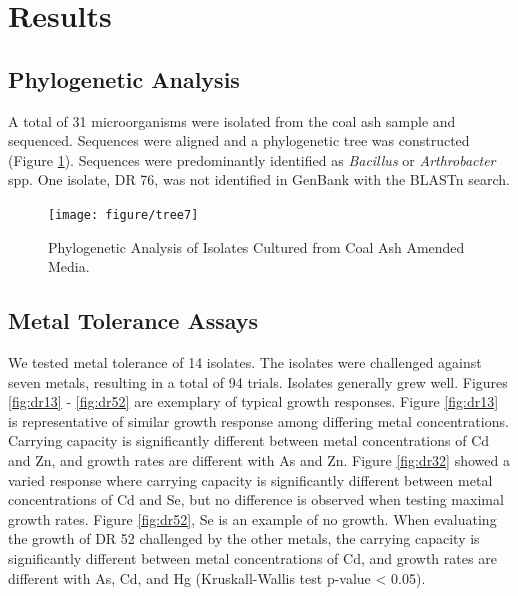 \documentclass[ms, hidelinks]{uncgdissertationexp}
\theoremstyle{plain}
\theoremstyle{definition}
\theoremstyle{remark}
\begin{document}
\hypertarget{results-1}{%
\section{Results}\label{results-1}}

\hypertarget{phylogenetic-analysis}{%
\subsection{Phylogenetic Analysis}\label{phylogenetic-analysis}}

A total of 31 microorganisms were isolated from the coal ash sample and sequenced. Sequences were aligned and a phylogenetic tree was constructed (Figure \ref{fig:tree}). Sequences were predominantly identified as \emph{Bacillus} or \emph{Arthrobacter} spp. One isolate, DR 76, was not identified in GenBank with the BLASTn search. 
\begin{figure}[htbp]
  \centering
  \texttt{[image: figure/tree7]}
  \caption[Phylogenetic Analysis of Isolates Cultured from Coal Ash Amended Media.]{Phylogenetic Analysis of Isolates Cultured from Coal Ash Amended Media.}\label{fig:tree}
\end{figure}

\hypertarget{metal-tolerance-assays}{%
\subsection{Metal Tolerance Assays}\label{metal-tolerance-assays}}

We tested metal tolerance of 14 isolates. The isolates were challenged against seven metals, resulting in a total of 94 trials. Isolates generally grew well. Figures \ref{fig:dr13} - \ref{fig:dr52} are exemplary of typical growth responses. Figure \ref{fig:dr13} is representative of similar growth response among differing metal concentrations. Carrying capacity is significantly different between metal concentrations of Cd and Zn, and growth rates are different with As and Zn. Figure \ref{fig:dr32} showed a varied response where carrying capacity is significantly different between metal concentrations of Cd and Se, but no difference is observed when testing maximal growth rates. Figure \ref{fig:dr52}, Se is an example of no growth. When evaluating the growth of DR 52 challenged by the other metals, the carrying capacity is significantly different between metal concentrations of Cd, and growth rates are different with As, Cd, and Hg (Kruskall-Wallis test p-value < 0.05). 
\end{document}
